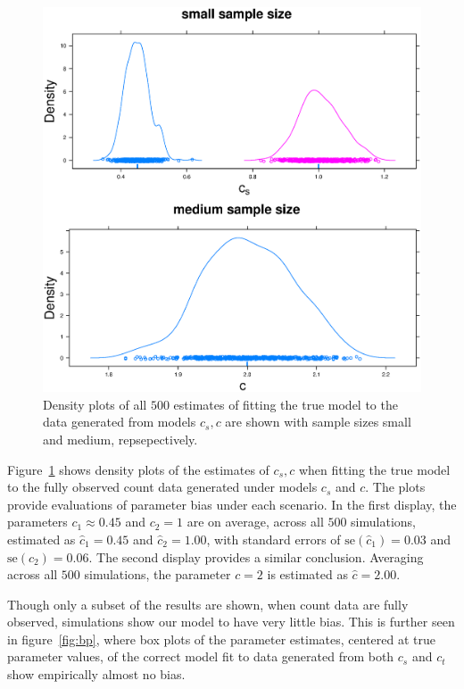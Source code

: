 \begin{figure}
  \centering
  \includegraphics[scale=0.5]{nonem}
  \caption{Density plots of all $500$ estimates of fitting the true model to the data generated from models $c_s,c$ are shown with sample sizes small and medium, repsepectively.}
  \label{fig:nonem}
\end{figure}


Figure~\ref{fig:nonem} shows density plots of the estimates of $c_s,c$ when fitting the true model to the fully observed count data generated under models $c_s$ and $c$.  The plots provide evaluations of parameter bias under each scenario.  In the first display, the parameters $c_1 \approx 0.45$ and $c_2 = 1$ are on average, across all $500$ simulations, estimated as $\hat{c}_1 = 0.45$ and $\hat{c}_2 = 1.00$, with standard errors of $\text{se}(\hat{c}_1) = 0.03$ and $\text{se}(\hat{c}_2) = 0.06$.  The second display provides a similar conclusion.  Averaging across all $500$ simulations, the parameter $c=2$ is estimated as $\hat{c} = 2.00$.  

Though only a subset of the results are shown, when count data are fully observed, simulations show our model to have very little bias.  This is further seen in figure~\ref{fig:bp}, where box plots of the parameter estimates, centered at true parameter values, of the correct model fit to data generated from both $c_s$ and $c_t$ show empirically almost no bias.

